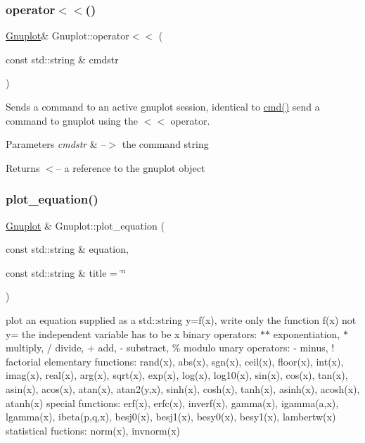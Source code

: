 \subsubsection{\texorpdfstring{operator$<$$<$()}{operator<<()}}
{\footnotesize\ttfamily \mbox{\hyperlink{class_gnuplot}{Gnuplot}}\& Gnuplot\+::operator$<$$<$ (\begin{DoxyParamCaption}\item[{const std\+::string \&}]{cmdstr }\end{DoxyParamCaption})\hspace{0.3cm}{\ttfamily [inline]}}



Sends a command to an active gnuplot session, identical to \mbox{\hyperlink{class_gnuplot_a07607803ede8dd5416906df0a1924fc5}{cmd()}} send a command to gnuplot using the $<$$<$ operator. 


\begin{DoxyParams}{Parameters}
{\em cmdstr} & --$>$ the command string\\
\hline
\end{DoxyParams}
\begin{DoxyReturn}{Returns}
$<$-- a reference to the gnuplot object 
\end{DoxyReturn}
\mbox{\label{class_gnuplot_a42dfb8c9d4636745c7be277ed818e849}} 
\subsubsection{\texorpdfstring{plot\+\_\+equation()}{plot\_equation()}}
{\footnotesize\ttfamily \mbox{\hyperlink{class_gnuplot}{Gnuplot}} \& Gnuplot\+::plot\+\_\+equation (\begin{DoxyParamCaption}\item[{const std\+::string \&}]{equation,  }\item[{const std\+::string \&}]{title = {\ttfamily \char`\"{}\char`\"{}} }\end{DoxyParamCaption})}

plot an equation supplied as a std\+::string y=f(x), write only the function f(x) not y= the independent variable has to be x binary operators\+: $\ast$$\ast$ exponentiation, $\ast$ multiply, / divide, + add, -\/ substract, \% modulo unary operators\+: -\/ minus, ! factorial elementary functions\+: rand(x), abs(x), sgn(x), ceil(x), floor(x), int(x), imag(x), real(x), arg(x), sqrt(x), exp(x), log(x), log10(x), sin(x), cos(x), tan(x), asin(x), acos(x), atan(x), atan2(y,x), sinh(x), cosh(x), tanh(x), asinh(x), acosh(x), atanh(x) special functions\+: erf(x), erfc(x), inverf(x), gamma(x), igamma(a,x), lgamma(x), ibeta(p,q,x), besj0(x), besj1(x), besy0(x), besy1(x), lambertw(x) statistical fuctions\+: norm(x), invnorm(x) \mbox{\label{class_gnuplot_a79aed3a6927f7d1d3497cba441e8a943}} 
